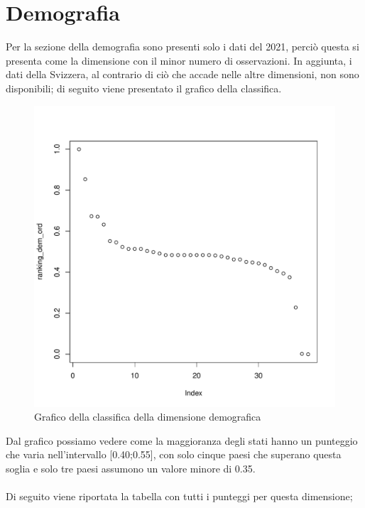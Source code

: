 \documentclass[a4paper,12pt, openright]{report}
\begin{document}
\newpage

\section{Demografia}

Per la sezione della demografia sono presenti solo i dati del 2021, perciò questa si presenta come la dimensione con il minor numero di osservazioni. In 
aggiunta, i dati della Svizzera, 
al contrario di ciò che accade nelle altre dimensioni, non sono disponibili; di seguito viene presentato il grafico della classifica. \\

\begin{figure}[H]
    \centering
    \includegraphics[scale=.5]{ranking_dem_norm.pdf}
    \caption{Grafico della classifica della dimensione demografica}
\end{figure}


Dal grafico possiamo vedere come la maggioranza degli stati hanno un punteggio che varia nell'intervallo [0.40;0.55], con solo cinque paesi che superano questa 
soglia e solo tre paesi assumono un valore minore di 0.35. \\
\\
Di seguito viene riportata la tabella con tutti i punteggi per questa dimensione; 
\end{document}
